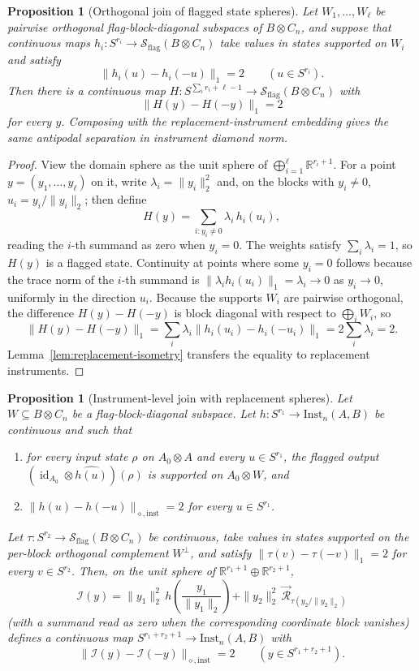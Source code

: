 \documentclass[11pt,a4paper]{article}
\newtheorem{proposition}[theorem]{Proposition}
\newcommand{\Sstate}{\mathcal{S}}
\newcommand{\Inst}{\mathrm{Inst}}
\newcommand{\id}{\operatorname{id}}
\begin{document}
\begin{proposition}[Orthogonal join of flagged state spheres]
\label{prop:join}
Let $W_1,\dots,W_\ell$ be pairwise orthogonal flag-block-diagonal subspaces of $B\otimes C_n$, and suppose that continuous maps $h_i:S^{r_i}\to\Sstate_{\mathrm{flag}}(B\otimes C_n)$ take values in states supported on $W_i$ and satisfy
\[
\|h_i(u)-h_i(-u)\|_1=2\qquad(u\in S^{r_i}).
\]
Then there is a continuous map $H:S^{\sum_i r_i+\ell-1}\to\Sstate_{\mathrm{flag}}(B\otimes C_n)$ with
\[
\|H(y)-H(-y)\|_1=2
\]
for every $y$. Composing with the replacement-instrument embedding gives the same antipodal separation in instrument diamond norm.
\end{proposition}

\begin{proof}
View the domain sphere as the unit sphere of $\bigoplus_{i=1}^{\ell}\mathbb R^{r_i+1}$. For a point $y=(y_1,\dots,y_\ell)$ on it, write
$\lambda_i=\|y_i\|_2^2$ and, on the blocks with $y_i\neq0$, $u_i=y_i/\|y_i\|_2$; then define
\[
H(y)=\sum_{i:y_i\neq0}\lambda_i\,h_i(u_i),
\]
reading the $i$-th summand as zero when $y_i=0$. The weights satisfy $\sum_i\lambda_i=1$, so $H(y)$ is a flagged state. Continuity at points where some $y_i=0$ follows because the trace norm of the $i$-th summand is $\|\lambda_i h_i(u_i)\|_1=\lambda_i\to0$ as $y_i\to0$, uniformly in the direction $u_i$. Because the supports $W_i$ are pairwise orthogonal, the difference $H(y)-H(-y)$ is block diagonal with respect to $\bigoplus_iW_i$, so
\[
\|H(y)-H(-y)\|_1
=\sum_i\lambda_i\|h_i(u_i)-h_i(-u_i)\|_1
=2\sum_i\lambda_i=2.
\]
Lemma~\ref{lem:replacement-isometry} transfers the equality to replacement instruments.
\end{proof}

\begin{proposition}[Instrument-level join with replacement spheres]
\label{prop:join-inst}
Let $W\subseteq B\otimes C_n$ be a flag-block-diagonal subspace. Let $h:S^{r_1}\to\Inst_n(A,B)$ be continuous and such that
\begin{enumerate}[leftmargin=*,itemsep=2pt]
\item for every input state $\rho$ on $A_0\otimes A$ and every $u\in S^{r_1}$, the flagged output $(\id_{A_0}\otimes\widehat{h(u)})(\rho)$ is supported on $A_0\otimes W$, and
\item $\|h(u)-h(-u)\|_{\diamond,\mathrm{inst}}=2$ for every $u\in S^{r_1}$.
\end{enumerate}
Let $\tau:S^{r_2}\to\Sstate_{\mathrm{flag}}(B\otimes C_n)$ be continuous, take values in states supported on the per-block orthogonal complement $W^{\perp}$, and satisfy $\|\tau(v)-\tau(-v)\|_1=2$ for every $v\in S^{r_2}$. Then, on the unit sphere of $\mathbb R^{r_1+1}\oplus\mathbb R^{r_2+1}$,
\[
\mathcal I(y)=\|y_1\|_2^2\,h\!\left(\frac{y_1}{\|y_1\|_2}\right)
+\|y_2\|_2^2\,\vec{\mathcal R}_{\tau(y_2/\|y_2\|_2)}
\]
(with a summand read as zero when the corresponding coordinate block vanishes) defines a continuous map $S^{r_1+r_2+1}\to\Inst_n(A,B)$ with
\[
\|\mathcal I(y)-\mathcal I(-y)\|_{\diamond,\mathrm{inst}}=2\qquad(y\in S^{r_1+r_2+1}).
\]
\end{proposition}
\end{document}
